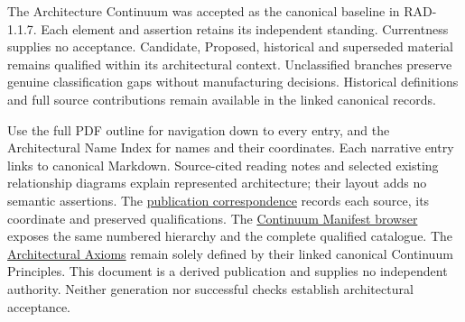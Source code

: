 \documentclass[10pt,a4paper,oneside,headings=small]{scrreprt}
\begin{document}
The Architecture Continuum was accepted as the canonical baseline in RAD-1.1.7.
Each element and assertion retains its independent standing. Currentness supplies
no acceptance. Candidate, Proposed, historical and superseded material remains
qualified within its architectural context. Unclassified branches preserve genuine
classification gaps without manufacturing decisions. Historical definitions and
full source contributions remain available in the linked canonical records.

Use the full PDF outline for navigation down to every entry, and the Architectural
Name Index for names and their coordinates. Each narrative entry links to canonical
Markdown. Source-cited reading notes and selected existing relationship diagrams
explain represented architecture; their layout adds no semantic assertions.
The \href{structure.json}{publication correspondence} records each source, its
coordinate and preserved qualifications. The
\href{../../../continuum-manifest/published/1.1.10/continuum.html}{Continuum Manifest browser}
exposes the same numbered hierarchy and the complete qualified catalogue.
The \href{../../../../governance/architectural-axioms.md}{Architectural Axioms}
remain solely defined by their linked canonical Continuum Principles.
This document is a derived publication and supplies no independent authority.
Neither generation nor successful checks establish architectural acceptance.

\clearpage
{}







\clearpage
{}
{}
\renewcommand{\indexname}{Architectural Name Index}
\printindex
\end{document}
